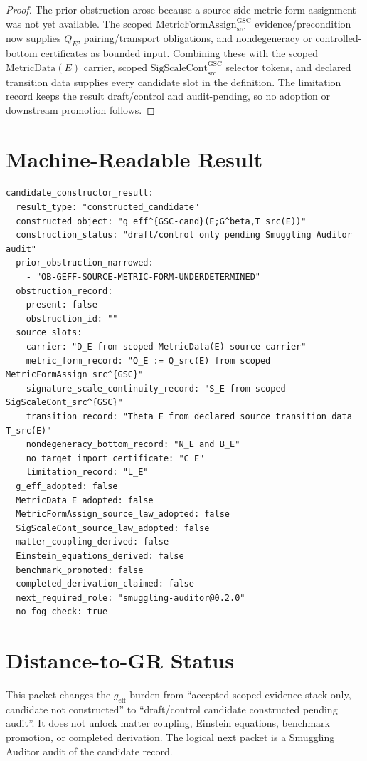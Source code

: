 \documentclass[11pt]{article}
\newcommand{\SigScaleCont}{\mathrm{SigScaleCont}^{\mathrm{GSC}}_{\mathrm{src}}}
\newcommand{\MetricFormAssign}{\mathrm{MetricFormAssign}^{\mathrm{GSC}}_{\mathrm{src}}}
\begin{document}
\begin{proof}
The prior obstruction arose because a source-side metric-form assignment was
not yet available. The scoped \(\MetricFormAssign\) evidence/precondition now
supplies \(Q_E\), pairing/transport obligations, and nondegeneracy or
controlled-bottom certificates as bounded input. Combining these with the
scoped \(\mathrm{MetricData}(E)\) carrier, scoped \(\SigScaleCont\) selector
tokens, and declared transition data supplies every candidate slot in the
definition. The limitation record keeps the result draft/control and
audit-pending, so no adoption or downstream promotion follows.
\end{proof}

\section*{Machine-Readable Result}

\begin{verbatim}
candidate_constructor_result:
  result_type: "constructed_candidate"
  constructed_object: "g_eff^{GSC-cand}(E;G^beta,T_src(E))"
  construction_status: "draft/control only pending Smuggling Auditor audit"
  prior_obstruction_narrowed:
    - "OB-GEFF-SOURCE-METRIC-FORM-UNDERDETERMINED"
  obstruction_record:
    present: false
    obstruction_id: ""
  source_slots:
    carrier: "D_E from scoped MetricData(E) source carrier"
    metric_form_record: "Q_E := Q_src(E) from scoped MetricFormAssign_src^{GSC}"
    signature_scale_continuity_record: "S_E from scoped SigScaleCont_src^{GSC}"
    transition_record: "Theta_E from declared source transition data T_src(E)"
    nondegeneracy_bottom_record: "N_E and B_E"
    no_target_import_certificate: "C_E"
    limitation_record: "L_E"
  g_eff_adopted: false
  MetricData_E_adopted: false
  MetricFormAssign_source_law_adopted: false
  SigScaleCont_source_law_adopted: false
  matter_coupling_derived: false
  Einstein_equations_derived: false
  benchmark_promoted: false
  completed_derivation_claimed: false
  next_required_role: "smuggling-auditor@0.2.0"
  no_fog_check: true
\end{verbatim}

\section*{Distance-to-GR Status}

This packet changes the \(g_{\mathrm{eff}}\) burden from
``accepted scoped evidence stack only, candidate not constructed'' to
``draft/control candidate constructed pending audit''. It does not unlock
matter coupling, Einstein equations, benchmark promotion, or completed
derivation. The logical next packet is a Smuggling Auditor audit of the
candidate record.
\end{document}
